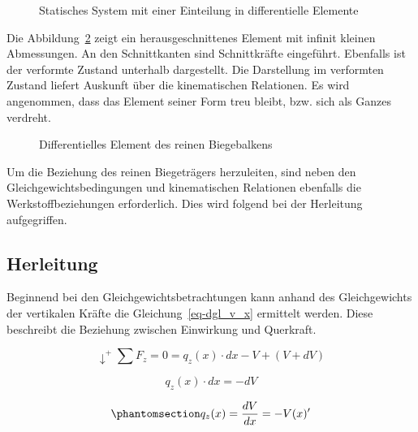 \documentclass[
  12pt,
  letterpaper,
  egregdoesnotlikesansseriftitles]{scrreprt}
\begin{document}
\begin{figure}[H]


\caption{\label{fig-reine_biegung_system}Statisches System mit einer
Einteilung in differentielle Elemente}

\end{figure}%

Die Abbildung~\ref{fig-system_reine_biegung_element} zeigt ein
herausgeschnittenes Element mit infinit kleinen Abmessungen. An den
Schnittkanten sind Schnittkräfte eingeführt. Ebenfalls ist der verformte
Zustand unterhalb dargestellt. Die Darstellung im verformten Zustand
liefert Auskunft über die kinematischen Relationen. Es wird angenommen,
dass das Element seiner Form treu bleibt, bzw. sich als Ganzes verdreht.

\begin{figure}[H]


\caption{\label{fig-system_reine_biegung_element}Differentielles Element
des reinen Biegebalkens}

\end{figure}%

Um die Beziehung des reinen Biegeträgers herzuleiten, sind neben den
Gleichgewichtsbedingungen und kinematischen Relationen ebenfalls die
Werkstoffbeziehungen erforderlich. Dies wird folgend bei der Herleitung
aufgegriffen.

\subsection{Herleitung}\label{herleitung}

Beginnend bei den Gleichgewichtsbetrachtungen kann anhand des
Gleichgewichts der vertikalen Kräfte die Gleichung~\ref{eq-dgl_v_x}
ermittelt werden. Diese beschreibt die Beziehung zwischen Einwirkung und
Querkraft.

\[
\downarrow^+\sum F_z = 0 = q_z(x)\cdot dx -V + (V+dV)
\]

\[
q_z(x)\cdot dx = - dV
\]

\begin{equation}\phantomsection\label{eq-dgl_v_x}{
q_z(x) = \frac{dV}{dx} = -V(x)'     
}\end{equation}
\end{document}
